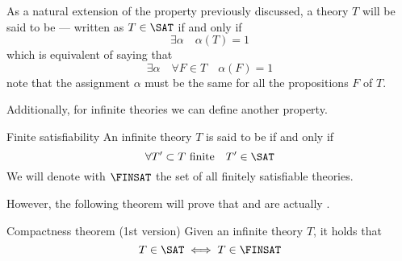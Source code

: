\documentclass[a4paper, 12pt]{report}
\begin{document}
    As a natural extension of the  property previously discussed, a theory $T$ will be said to be  --- written as $T \in \SAT$ if and only if $$\exists \alpha \quad \alpha(T) = 1$$ which is equivalent of saying that $$\exists \alpha \quad \forall F \in T \quad \alpha (F) = 1$$ note that the assignment $\alpha$ must be the same for all the propositions $F$ of $T$.

    Additionally, for infinite theories we can define another property.

    \begin{frameddefn}{Finite satisfiability}
        An infinite theory $T$ is said to be  if and only if $$\forall T' \subset T \ \mathrm{finite} \quad T' \in \SAT$$ We will denote with $\FINSAT$ the set of all finitely satisfiable theories.
    \end{frameddefn}
    
    However, the following theorem will prove that  and  are actually .

    \begin{framedthm}{Compactness theorem (1st version)}
        Given an infinite theory $T$, it holds that $$T \in \SAT \iff T \in \FINSAT$$
    \end{framedthm}
\end{document}
